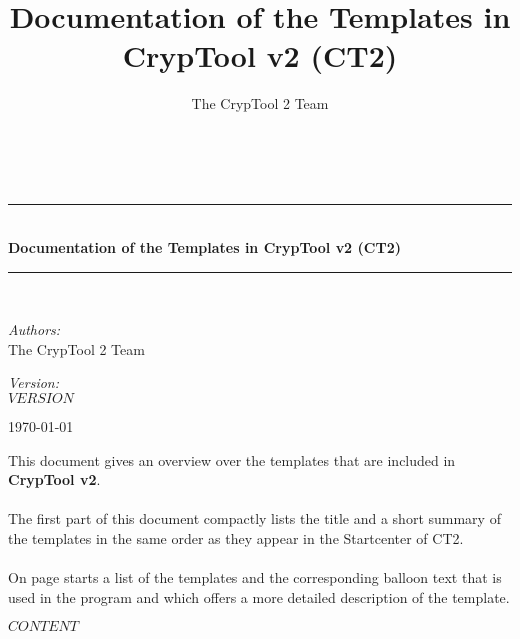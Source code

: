\documentclass[10pt,a4paper]{scrreprt}
\title{Documentation of the Templates in CrypTool v2 (CT2)}
\author{The CrypTool 2 Team}
\newcommand{\HRule}{\rule{\linewidth}{0.5mm}}
\begin{document}
\begin{titlepage}
\begin{center}
\hspace{0pt}\\[2.5cm]

\HRule \\[0.4cm]
{ \huge \bfseries Documentation of the Templates in CrypTool v2 (CT2) }\\[0.4cm]
\HRule \\[1.5cm]

\begin{minipage}{0.4\textwidth}
\begin{flushleft} \large
\emph{Authors:} \\
The CrypTool 2 Team
\end{flushleft}
\end{minipage}
\begin{minipage}{0.4\textwidth}
\begin{flushright} \large
\emph{Version:} \\
$VERSION$
\end{flushright}
\end{minipage}
\vfill
{\large \today}
\end{center}
\newpage
\large
This document gives an overview over the templates that are included in {\bf CrypTool v2}.\\\\
The first part of this document compactly lists the title and a short summary of the templates in the same order as they appear in the Startcenter of CT2.\\\\
On page \pageref{part2} starts a list of the templates and the corresponding balloon text that is used in the program and which offers a more detailed description of the template.
\newpage
\end{titlepage}

\tableofcontents
\newpage

$CONTENT$
\end{document}
